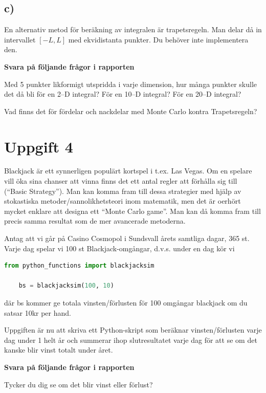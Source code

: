\documentclass[a4paper]{article}
\begin{document}
\subsection{c)}
En alternativ metod för beräkning av integralen är trapetsregeln.
Man delar då in intervallet \([-L, L]\) med ekvidistanta punkter.
Du behöver inte implementera den.

\textbf{Svara på följande frågor i rapporten}

Med 5 punkter likformigt utspridda i varje dimension, hur många punkter skulle
det då bli för en 2--D integral? För en 10--D integral? För en 20--D integral?

Vad finns det för fördelar och nackdelar med Monte Carlo kontra Trapetsregeln?

\newpage
\section{Uppgift 4}

Blackjack är ett synnerligen populärt kortspel i t.ex. Las Vegas.
Om en spelare vill öka sina chanser att vinna finns det ett antal regler att
förhålla sig till (``Basic Strategy''). Man kan komma fram till dessa strategier
med hjälp av stokastiska metoder/sannolikhetsteori inom matematik, men det är oerhört
mycket enklare att designa ett ``Monte Carlo game''. Man kan då komma fram till precis
samma resultat som de mer avancerade metoderna.

Antag att vi går på Casino Cosmopol i Sundsvall årets samtliga dagar, 365 st.
Varje dag spelar vi 100 st Blackjack-omgångar, d.v.s. under en dag kör vi 
\begin{lstlisting}[language=Python]
    from python_functions import blackjacksim

    bs = blackjacksim(100, 10)
\end{lstlisting}
där bs kommer ge totala vinsten/förlusten för 100 omgångar blackjack om du satsar 10kr per hand.

Uppgiften är nu att skriva ett Python-skript som beräknar vinsten/förlusten varje dag under 1
helt år och summerar ihop slutresultatet varje dag för att se om det kanske blir vinst totalt under året.

\textbf{Svara på följande frågor i rapporten}

Tycker du dig se om det blir vinst eller förlust?





\newpage
\printbibliography
\end{document}
